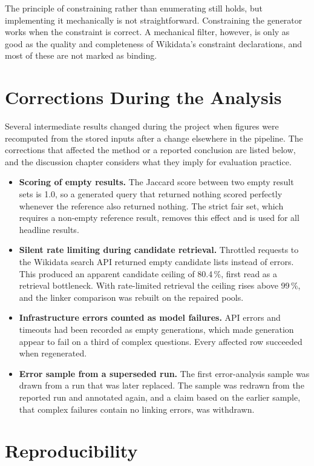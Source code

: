 The principle of constraining rather than enumerating still holds, but implementing it mechanically is not straightforward.
Constraining the generator works when the constraint is correct.
A mechanical filter, however, is only as good as the quality and completeness of Wikidata's constraint declarations, and most of these are not marked as binding.

\section{Corrections During the Analysis}
\label{app:errata}

Several intermediate results changed during the project when figures were recomputed from the stored inputs after a change elsewhere in the pipeline.
The corrections that affected the method or a reported conclusion are listed below, and the discussion chapter considers what they imply for evaluation practice.

\begin{itemize}
\item \textbf{Scoring of empty results.}
The Jaccard score between two empty result sets is 1.0, so a generated query that returned nothing scored perfectly whenever the reference also returned nothing.
The strict fair set, which requires a non-empty reference result, removes this effect and is used for all headline results.
\item \textbf{Silent rate limiting during candidate retrieval.}
Throttled requests to the Wikidata search API returned empty candidate lists instead of errors.
This produced an apparent candidate ceiling of 80.4\,\%, first read as a retrieval bottleneck.
With rate-limited retrieval the ceiling rises above 99\,\%, and the linker comparison was rebuilt on the repaired pools.
\item \textbf{Infrastructure errors counted as model failures.}
API errors and timeouts had been recorded as empty generations, which made generation appear to fail on a third of complex questions.
Every affected row succeeded when regenerated.
\item \textbf{Error sample from a superseded run.}
The first error-analysis sample was drawn from a run that was later replaced.
The sample was redrawn from the reported run and annotated again, and a claim based on the earlier sample, that complex failures contain no linking errors, was withdrawn.
\end{itemize}

\section{Reproducibility}
\label{app:repro}

